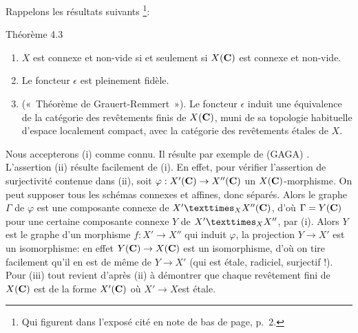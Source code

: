\documentclass[10pt]{../fichiers-configuration-latex/smfart}
\begin{document}
Rappelons les résultats suivants \footnote{Qui figurent dans
  l'exposé cité en note de bas de page, p.~2.}: %

\begin{enonce*}{Théorème 4.3}
\begin{enumerate}
\renewcommand{\theenumi}{\roman{enumi}}
\renewcommand{\labelenumi}{(\theenumi)}
\item $X$ est connexe et non-vide si et seulement si $X(\mathbf{C})$
  est connexe et non-vide.

\item Le foncteur $\epsilon$ est pleinement fidèle.

\item (« Théorème de Grauert-Remmert »). Le foncteur $\epsilon$
  induit une équivalence de la catégorie des revêtements finis de
  $X(\mathbf{C})$, muni de sa topologie habituelle d'espace localement
  compact, avec la catégorie des revêtements étales de $X$.
\end{enumerate}
\end{enonce*}

Nous accepterons (i) comme connu. Il résulte par exemple de (GAGA) %
\cite{SGA4-11:4}. L'assertion (ii) résulte facilement de (i). En effet, pour
vérifier l'assertion de surjectivité contenue dans (ii), soit
$\varphi:X'(\mathbf{C})\rightarrow X''(\mathbf{C})$ un
$X(\mathbf{C})$-morphisme. On peut supposer tous les schémas connexes
et affines, donc séparés. Alors le graphe $\Gamma$ de $\varphi$ est
une composante connexe de $\fprod{X'}{X''}{X}(\CC)$, d'où
$\Gamma=Y(\mathbf{C})$ pour une certaine composante connexe $Y$ de
$\fprod{X'}{X''}{X}$, par (i). Alors $Y$ est le graphe d'un morphisme
$f:X'\rightarrow X''$ qui induit $\varphi$, \ie la projection
$Y\rightarrow X'$ est un isomorphisme: en effet
$Y(\mathbf{C})\rightarrow X(\mathbf{C})$ est un isomorphisme, d'où on
tire facilement qu'il en est de même de $Y\rightarrow X'$ (qui est
étale, radiciel, surjectif !). Pour (iii) tout revient d'après (ii) à
démontrer que chaque revêtement fini de $X(\mathbf{C})$ est de la
forme $X'(\mathbf{C})$ où  $X'\rightarrow X$\pageoriginale est étale.
\end{document}
